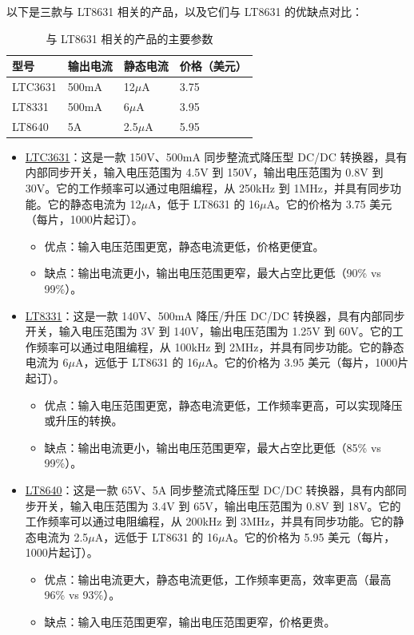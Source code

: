 \documentclass[lang=cn,10pt]{elegantbook}
\begin{document}
以下是三款与 LT8631 相关的产品，以及它们与 LT8631 的优缺点对比：

\begin{table}[h]
\centering
\begin{tabular}{@{}llll@{}}
\toprule
型号 & 输出电流 & 静态电流 & 价格（美元） \\ \midrule
LTC3631 & 500mA & 12$\mu$A & 3.75 \\
LT8331 & 500mA & 6$\mu$A & 3.95 \\
LT8640 & 5A & 2.5$\mu$A & 5.95 \\ \bottomrule
\end{tabular}
\caption{与 LT8631 相关的产品的主要参数}
\label{tab:products}
\end{table}

\begin{itemize}
\item \href{https://www.analog.com/en/products/ltc3631.html}{LTC3631}：这是一款 150V、500mA 同步整流式降压型 DC/DC 转换器，具有内部同步开关，输入电压范围为 4.5V 到 150V，输出电压范围为 0.8V 到 30V。它的工作频率可以通过电阻编程，从 250kHz 到 1MHz，并具有同步功能。它的静态电流为 12$\mu$A，低于 LT8631 的 16$\mu$A。它的价格为 3.75 美元（每片，1000片起订）。
    \begin{itemize}
    \item 优点：输入电压范围更宽，静态电流更低，价格更便宜。
    \item 缺点：输出电流更小，输出电压范围更窄，最大占空比更低（90\% vs 99\%）。
    \end{itemize}
\item \href{https://www.analog.com/en/products/lt8331.html}{LT8331}：这是一款 140V、500mA 降压/升压 DC/DC 转换器，具有内部同步开关，输入电压范围为 3V 到 140V，输出电压范围为 1.25V 到 60V。它的工作频率可以通过电阻编程，从 100kHz 到 2MHz，并具有同步功能。它的静态电流为 6$\mu$A，远低于 LT8631 的 16$\mu$A。它的价格为 3.95 美元（每片，1000片起订）。
    \begin{itemize}
    \item 优点：输入电压范围更宽，静态电流更低，工作频率更高，可以实现降压或升压的转换。
    \item 缺点：输出电流更小，输出电压范围更窄，最大占空比更低（85\% vs 99\%）。
    \end{itemize}
\item \href{https://www.analog.com/en/products/lt8640.html}{LT8640}：这是一款 65V、5A 同步整流式降压型 DC/DC 转换器，具有内部同步开关，输入电压范围为 3.4V 到 65V，输出电压范围为 0.8V 到 18V。它的工作频率可以通过电阻编程，从 200kHz 到 3MHz，并具有同步功能。它的静态电流为 2.5$\mu$A，远低于 LT8631 的 16$\mu$A。它的价格为 5.95 美元（每片，1000片起订）。
    \begin{itemize}
    \item 优点：输出电流更大，静态电流更低，工作频率更高，效率更高（最高 96\% vs 93\%）。
    \item 缺点：输入电压范围更窄，输出电压范围更窄，价格更贵。
    \end{itemize}
\end{itemize}
\end{document}
